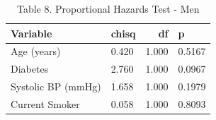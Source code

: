 \begin{table}[ht]
\centering
\caption{Table 8. Proportional Hazards Test - Men} 
\begin{tabular}{llrl}
  \toprule
Variable & chisq & df & p \\ 
  \midrule
Age (years) & 0.420 & 1.000 & 0.5167 \\ 
  Diabetes & 2.760 & 1.000 & 0.0967 \\ 
  Systolic BP (mmHg) & 1.658 & 1.000 & 0.1979 \\ 
  Current Smoker & 0.058 & 1.000 & 0.8093 \\ 
   \bottomrule
\end{tabular}
\end{table}
